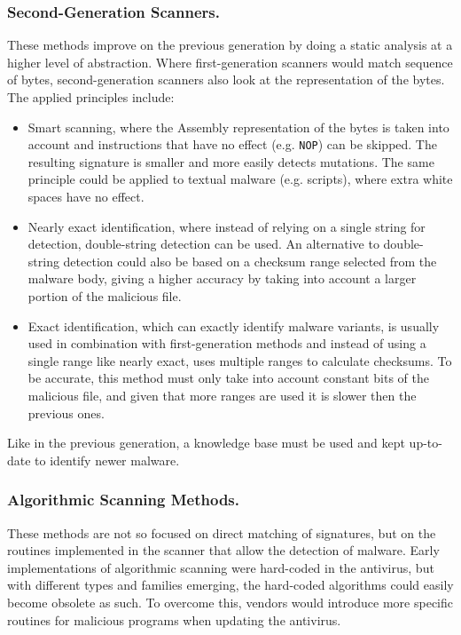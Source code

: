 \documentclass{llncs}
\begin{document}
\subsubsection{Second-Generation Scanners.} These methods improve on the previous generation by doing a static analysis at a higher level of abstraction. Where first-generation scanners would match sequence of bytes, second-generation scanners also look at the representation of the bytes. The applied principles include:
\begin{itemize}
	\item Smart scanning, where the Assembly representation of the bytes is taken into account and instructions that have no effect (e.g. \texttt{NOP}) can be skipped. The resulting signature is smaller and more easily detects mutations. The same principle could be applied to textual malware (e.g. scripts), where extra white spaces have no effect.
	\item Nearly exact identification, where instead of relying on a single string for detection, double-string detection can be used. An alternative to double-string detection could also be based on a checksum range selected from the malware body, giving a higher accuracy by taking into account a larger portion of the malicious file.
	\item Exact identification, which can exactly identify malware variants, is usually used in combination with first-generation methods and instead of using a single range like nearly exact, uses multiple ranges to calculate checksums. To be accurate, this method must only take into account constant bits of the malicious file, and given that more ranges are used it is slower then the previous ones.
\end{itemize}

Like in the previous generation, a knowledge base must be used and kept up-to-date to identify newer malware.

\subsubsection{Algorithmic Scanning Methods.} These methods are not so focused on direct matching of signatures, but on the routines implemented in the scanner that allow the detection of malware. Early implementations of algorithmic scanning were hard-coded in the antivirus, but with different types and families emerging, the hard-coded algorithms could easily become obsolete as such. To overcome this, vendors would introduce more specific routines for malicious programs when updating the antivirus.
\end{document}
